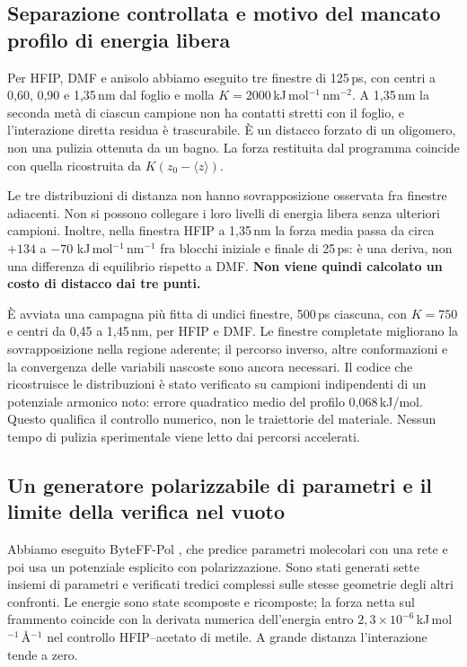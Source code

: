 \documentclass[11pt,reqno]{amsart}
\numberwithin{equation}{section}
\begin{document}
\subsection{Separazione controllata e motivo del mancato profilo di energia libera}

Per HFIP, DMF e anisolo abbiamo eseguito tre finestre di 125\,ps,
con centri a 0,60, 0,90 e 1,35\,nm dal foglio e molla
$K=2000$\,kJ\,mol$^{-1}$\,nm$^{-2}$. A 1,35\,nm la seconda
met\`a di ciascun campione non ha contatti stretti con il foglio,
e l'interazione diretta residua \`e trascurabile. \`E un distacco
forzato di un oligomero, non una pulizia ottenuta da un bagno.
La forza restituita dal programma coincide con quella ricostruita
da $K(z_0-\langle z\rangle)$.

Le tre distribuzioni di distanza non hanno sovrapposizione osservata
fra finestre adiacenti. Non si possono collegare i loro livelli
di energia libera senza ulteriori campioni. Inoltre, nella finestra
HFIP a 1,35\,nm la forza media passa da circa $+134$ a $-70$
kJ\,mol$^{-1}$\,nm$^{-1}$ fra blocchi iniziale e finale di 25\,ps:
\`e una deriva, non una differenza di equilibrio rispetto a DMF.
\textbf{Non viene quindi calcolato un costo di distacco dai tre punti.}

\`E avviata una campagna pi\`u fitta di undici finestre,
500\,ps ciascuna, con $K=750$ e centri da 0,45 a 1,45\,nm,
per HFIP e DMF. Le finestre completate migliorano la sovrapposizione
nella regione aderente; il percorso inverso, altre conformazioni e
la convergenza delle variabili nascoste sono ancora necessari.
Il codice che ricostruisce le distribuzioni \`e stato verificato
su campioni indipendenti di un potenziale armonico noto:
errore quadratico medio del profilo 0,068\,kJ/mol.
Questo qualifica il controllo numerico, non le traiettorie del materiale.
Nessun tempo di pulizia sperimentale viene letto dai percorsi accelerati.

\subsection{Un generatore polarizzabile di parametri e il limite della verifica nel vuoto}

Abbiamo eseguito ByteFF-Pol \cite{ByteFFPol2026}, che predice
parametri molecolari con una rete e poi usa un potenziale esplicito
con polarizzazione. Sono stati generati sette insiemi di parametri
e verificati tredici complessi sulle stesse geometrie degli altri
confronti. Le energie sono state scomposte e ricomposte;
la forza netta sul frammento coincide con la derivata numerica
dell'energia entro $2,3\times10^{-6}$\,kJ\,mol$^{-1}$\,\AA$^{-1}$
nel controllo HFIP--acetato di metile. A grande distanza
l'interazione tende a zero.
\end{document}
